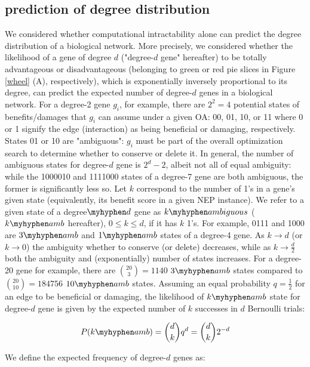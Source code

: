 \documentclass[12pt]{article}
\begin{document}
\subsection{prediction of degree distribution}\label{prediction_section}
We considered whether computational intractability alone can predict the degree distribution of a biological network. More precisely, we considered whether the likelihood of a gene of degree $d$ ("degree-$d$ gene" hereafter) to be totally advantageous or disadvantageous (belonging to green or red pie slices in Figure \ref{wheel} (A), respectively), which is exponentially inversely proportional to its degree, can predict the expected number of degree-$d$ genes in a biological network. For a degree-2 gene $g_i$, for example, there are $2^2=4$ potential states of benefits/damages that $g_i$ can assume under a given OA: 00, 01, 10, or 11 where 0 or 1 signify the edge (interaction) as being  beneficial or damaging, respectively. States 01 or 10  are "ambiguous": $g_i$ must be part of the overall optimization search to determine whether to conserve or delete it. In general, the number of ambiguous states for degree-$d$  gene is $2^d - 2$, albeit not all of equal ambiguity: while the 1000010 and 1111000 states of a degree-7 gene are both ambiguous, the former is significantly less so. Let $k$ correspond to the number of 1's in a gene's given state (equivalently, its benefit score in a given NEP instance). We refer to a given state of a degree$\myhyphen d$ gene as $k\myhyphen ambiguous$ ($k\myhyphen amb$ hereafter), $0 \leq k \leq d$, if it has $k$ 1's. For example, 0111 and 1000 are  $3\myhyphen amb$ and $1\myhyphen amb$ states of a degree-4 gene. As $k\to d$ (or $k\to 0$) the ambiguity whether to conserve (or delete) decreases, while as $k\to \frac{d}{2}$ both the ambiguity and (exponentially) number of states increases. For a degree-20 gene for example, there are ${20 \choose 3} = 1140$ $3\myhyphen amb$ states compared to ${20 \choose 10}=184756$ $10\myhyphen amb$ states. Assuming an equal probability $q=\frac{1}{2}$ for an edge to be beneficial or damaging, the likelihood of $k\myhyphen amb$ state for degree-$d$ gene is given by the expected number of $k$ successes in $d$ Bernoulli trials:

\begin{equation*}
		P(k\myhyphen amb) = {d \choose k}q^d = {d \choose k}2^{-d}
\end{equation*}

\noindent We define the expected frequency of degree-$d$ genes as:
\end{document}
